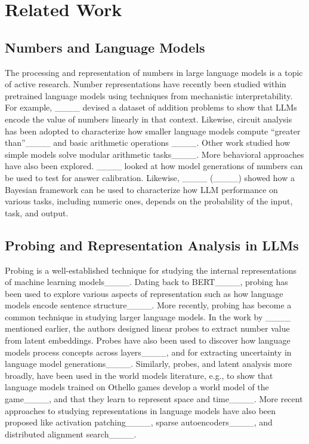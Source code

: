 \section{Related Work}
\subsection{Numbers and Language Models}
The processing and representation of numbers in large language models is a topic of active research. Number representations have recently been studied within pretrained language models using techniques from mechanistic interpretability. For example, ____ devised a dataset of addition problems to show that LLMs encode the value of numbers linearly in that context. Likewise, circuit analysis has been adopted to characterize how smaller language models compute ``greater than''____ and basic arithmetic operations ____. Other work studied how simple models solve modular arithmetic tasks____.  
More behavioral approaches have also been explored. ____ looked at how model generations of numbers can be used to test for answer calibration. Likewise, ____ (____) showed how a Bayesian framework can be used to characterize how LLM performance on various tasks, including numeric ones, depends on the probability of the input, task, and output.

\subsection{Probing and Representation Analysis in LLMs}
Probing is a well-established technique for studying the internal representations of machine learning models____. Dating back to BERT____, probing has been used to explore various aspects of representation such as how language models encode sentence structure____. More recently, probing has become a common technique in studying larger language models. In the work by ____ mentioned earlier, the authors designed linear probes to extract number value from latent embeddings. Probes have also been used to discover how language models process concepts across layers____, and for extracting uncertainty in language model generations____. 
Similarly, probes, and latent analysis more broadly, have been used in the world models literature, e.g., to show that language models trained on Othello games develop a world model of the game____, and that they learn to represent space and time____.
More recent approaches to studying representations in language models have also been proposed like activation patching____, sparse autoencoders____, and distributed alignment search____. 


